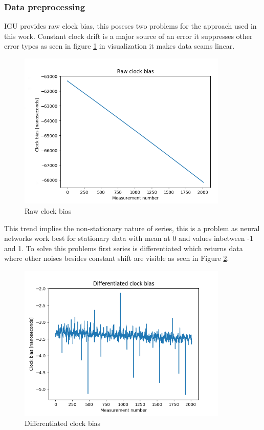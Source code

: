 \subsubsection{Data preprocessing}
IGU provides raw clock bias, this poseses two problems for the approach used in this work.
Constant clock drift is a major source of an error it suppresses other error types
as seen in figure \ref{fig:raw_bias} in visualization it makes data seams linear.
\begin{figure}[ht] 
	\centering
	\includegraphics[width=10cm]{res/bias_raw}
	\caption{Raw clock bias}
	\label{fig:raw_bias}
\end{figure}
This trend implies the non-stationary nature of series, this is a problem as neural networks work 
best for stationary data with mean at 0 and values inbetween -1 and 1.
To solve this problems first series is differentiated which returns data where other noises 
besides constant shift are visible as seen in Figure \ref{fig:diffed_bias}.
\begin{figure}[ht] 
	\centering
	\includegraphics[width=10cm]{res/bias_diffed}
	\caption{Differentiated clock bias}
	\label{fig:diffed_bias}
\end{figure}
